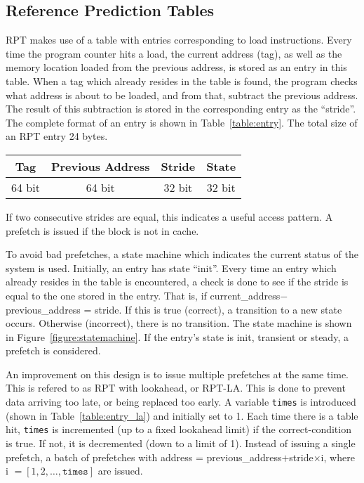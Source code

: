 \subsection{Reference Prediction Tables}

RPT makes use of a table with entries corresponding to load
instructions. Every time the program counter hits a load, the current
address (tag), as well as the memory location loaded from the previous
address, is stored as an entry in this table. When a tag which already
resides in the table is found, the program checks what address is about
to be loaded, and from that, subtract the previous address. The result
of this subtraction is stored in the corresponding entry as the
``stride''. The complete format of an entry is shown in
Table~\ref{table:entry}. The total size of an RPT entry 24 bytes.

\begin{center}
  \begin{tabular}{ | c | c | c | c |}
    \hline
    Tag & Previous Address & Stride & State \\ \hline
    64 bit & 64 bit & 32 bit & 32 bit \\ \hline
  \end{tabular}
  \label{table:entry}
\end{center}

If two consecutive strides are equal, this indicates a useful access
pattern. A prefetch is issued if the block is not in cache.

To avoid bad prefetches, a state machine which indicates the current
status of the system is used. Initially, an entry has state
``init''. Every time an entry which already resides in the table is
encountered, a check is done to see if the stride is equal to the one
stored in the entry. That is, if current\_address$ -
$previous\_address = stride. If this is true (correct), a transition
to a new state occurs. Otherwise (incorrect), there is no
transition. The state machine is shown in
Figure~\ref{figure:statemachine}. If the entry's state is init,
transient or steady, a prefetch is considered.

An improvement on this design is to issue multiple prefetches at the
same time. This is refered to as RPT with lookahead, or RPT-LA. This
is done to prevent data arriving too late, or being replaced too
early. A variable \texttt{times} is introduced (shown in
Table~\ref{table:entry_la}) and initially set to 1. Each time there is
a table hit, \texttt{times} is incremented (up to a fixed lookahead
limit) if the correct-condition is true. If not, it is decremented
(down to a limit of 1). Instead of issuing a single prefetch, a batch
of prefetches with address = previous\_address$ + $stride$\times$i,
where i $= [1, 2, \ldots, \texttt{times}]$ are issued.


